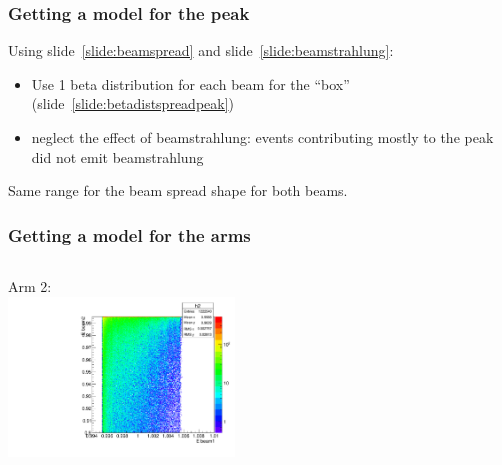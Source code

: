 \documentclass{beamer}
\begin{document}
\begin{frame}
\frametitle{Getting a model for the peak}
\begin{center}
\end{center}
Using slide~\ref{slide:beamspread} and slide~\ref{slide:beamstrahlung}:
\begin{itemize}
  \item Use 1 beta distribution for each beam for the ``box''
  (slide~\ref{slide:betadistspreadpeak})
  \item neglect the effect of beamstrahlung: events contributing mostly to the
  peak did not emit beamstrahlung
\end{itemize}
Same range for the beam spread shape for both beams. 
\end{frame}
\begin{frame}
\frametitle{Getting a model for the arms}
\begin{columns}[c]
\column{6cm}
\column{6cm}
\begin{center}
Arm 2:\\
\includegraphics[width=6cm]{Arm2.pdf}
\end{center}
\end{columns}
\end{frame}
\end{document}
